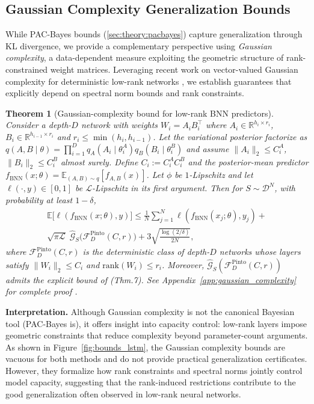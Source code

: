 \documentclass{article}
\theoremstyle{plain}
\newtheorem{theorem}{Theorem}[section]
\theoremstyle{definition}
\theoremstyle{remark}
\begin{document}
\subsection{Gaussian Complexity Generalization Bounds}
\label{sec:theory:gaussian_complexity}
While PAC-Bayes bounds (\cref{sec:theory:pacbayes}) capture generalization through KL divergence, 
we provide a complementary perspective using \emph{Gaussian complexity}, a data-dependent measure 
exploiting the geometric structure of rank-constrained weight matrices. Leveraging recent work 
on vector-valued Gaussian complexity for deterministic low-rank networks \citep{pinto2025on}, we 
establish guarantees that explicitly depend on spectral norm bounds and rank constraints. 
\begin{theorem}[Gaussian-complexity bound for low-rank BNN predictors]
\label{thm:bnn_main_icml}
Consider a depth-$D$ network with weights $W_i=A_iB_i^\top$ where
$A_i\in\mathbb{R}^{h_i\times r_i}$, $B_i\in\mathbb{R}^{h_{i-1}\times r_i}$ and
$r_i\le \min(h_i,h_{i-1})$. Let the variational posterior factorize as
$q(A,B\mid\theta)=\prod_{i=1}^D q_A(A_i\mid\theta_i^A)q_B(B_i\mid\theta_i^B)$ and assume
$\|A_i\|_2\le C_i^A$, $\|B_i\|_2\le C_i^B$ almost surely. Define $C_i:=C_i^AC_i^B$ and the
posterior-mean predictor $f_{\mathrm{BNN}}(x;\theta)=\mathbb{E}_{(A,B)\sim q}[f_{A,B}(x)]$. Let $\phi$ be $1$-Lipschitz and let $\ell(\cdot,y)\in[0,1]$ be $\mathcal{L}$-Lipschitz in its
first argument. Then for $S\sim\mathcal{D}^N$, with probability at least $1-\delta$,
{\small
\begin{equation}
\begin{aligned}
\mathbb{E}\big[\ell(f_{\mathrm{BNN}}(x;\theta),y)\big]
\le \frac{1}{N}\sum_{j=1}^N \ell(f_{\mathrm{BNN}}(x_j;\theta),y_j)
+ \\\sqrt{\pi\mathcal{L}}\;\hat{\mathcal{G}}_S\!\big(\mathcal{F}^{\mathrm{Pinto}}_D(C,r)\big)
+ 3\sqrt{\frac{\log(2/\delta)}{2N}},
\end{aligned}
\end{equation}
}
where $\mathcal{F}^{\mathrm{Pinto}}_D(C,r)$ is the deterministic class of depth-$D$ networks whose
layers satisfy $\|W_i\|_2\le C_i$ and $\mathrm{rank}(W_i)\le r_i$. Moreover,
$\hat{\mathcal{G}}_S(\mathcal{F}^{\mathrm{Pinto}}_D(C,r))$ admits the explicit bound of
\cite{pinto2025on}(Thm.7). See Appendix~\ref{app:gaussian_complexity} for complete proof .
\end{theorem}
\textbf{Interpretation.}
Although Gaussian complexity is not the canonical Bayesian tool (PAC-Bayes is), it offers insight into capacity control: low-rank layers impose geometric constraints that reduce complexity beyond parameter-count arguments. As shown in Figure~\ref{fig:bounds_lstm}, the Gaussian complexity bounds are vacuous for both methods and do not provide practical generalization certificates. However, they formalize how rank constraints and spectral norms jointly control model capacity, suggesting that the rank-induced restrictions contribute to the good generalization often observed in low-rank neural networks.
\end{document}
